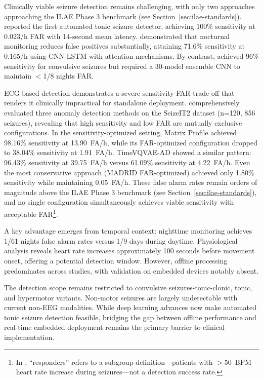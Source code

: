 Clinically viable seizure detection remains challenging, with only two approaches approaching the ILAE Phase 3 benchmark (see Section~\ref{sec:ilae-standards}). \parencite{fineDetectionKeyAutomated2025} reported the first automated tonic seizure detector, achieving 100\% sensitivity at 0.023/h FAR with 14-second mean latency. \parencite{dongDetectionNocturnalEpileptic2026} demonstrated that nocturnal monitoring reduces false positives substantially, attaining 71.6\% sensitivity at 0.165/h using CNN-LSTM with attention mechanisms. By contrast, \parencite{spahrDeepLearningbasedDetection2025} achieved 96\% sensitivity for convulsive seizures but required a 30-model ensemble CNN to maintain $<$1/8 nights FAR.

ECG-based detection demonstrates a severe sensitivity-FAR trade-off that renders it clinically impractical for standalone deployment. \parencite{reintjesECGBasedDetectionEpileptic2025} comprehensively evaluated three anomaly detection methods on the SeizeIT2 dataset (n=120, 856 seizures), revealing that high sensitivity and low FAR are mutually exclusive configurations. In the sensitivity-optimized setting, Matrix Profile achieved 98.16\% sensitivity at 13.90~FA/h, while its FAR-optimized configuration dropped to 38.04\% sensitivity at 1.91~FA/h. TimeVQVAE-AD showed a similar pattern: 96.43\% sensitivity at 39.75~FA/h versus 61.09\% sensitivity at 4.22~FA/h. Even the most conservative approach (MADRID FAR-optimized) achieved only 1.80\% sensitivity while maintaining 0.05~FA/h. These false alarm rates remain orders of magnitude above the ILAE Phase 3 benchmark (see Section~\ref{sec:ilae-standards}), and no single configuration simultaneously achieves viable sensitivity with acceptable FAR\footnote{In \parencite{reintjesECGBasedDetectionEpileptic2025}, ``responders'' refers to a subgroup definition---patients with $>$50~BPM heart rate increase during seizures---not a detection success rate.}.

A key advantage emerges from temporal context: nighttime monitoring achieves 1/61 nights false alarm rates versus 1/9 days during daytime. Physiological analysis reveals heart rate increases approximately 100 seconds before movement onset, offering a potential detection window. However, offline processing predominates across studies, with validation on embedded devices notably absent.

The detection scope remains restricted to convulsive seizures-tonic-clonic, tonic, and hypermotor variants. Non-motor seizures are largely undetectable with current non-EEG modalities. While deep learning advances now make automated tonic seizure detection feasible, bridging the gap between offline performance and real-time embedded deployment remains the primary barrier to clinical implementation.

